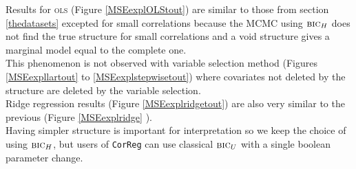 \documentclass[12pt,a4paper]{report}
\begin{document}
Results for \textsc{ols} (Figure \ref{MSEexplOLStout}) are similar to those from section \ref{thedatasets} excepted for small correlations because the MCMC using $\mbox{{\sc bic}}_H$ does not find the true structure for small correlations and a void structure gives a marginal model equal to the complete one.  \\
 This phenomenon is not observed with variable selection method (Figures \ref{MSEexpllartout} to \ref{MSEexplstepwisetout})
  where covariates not deleted by the structure are deleted by the variable selection. \\
 Ridge regression results (Figure \ref{MSEexplridgetout}) are also very similar to the previous (Figure \ref{MSEexplridge} ).\\
 
 Having simpler structure is important for interpretation so we keep the choice of using $\mbox{{\sc bic}}_H$, but users of {\tt CorReg} can use classical $\mbox{{\sc bic}}_U$ with a single boolean parameter change.

 
\FloatBarrier

\newpage
\end{document}

